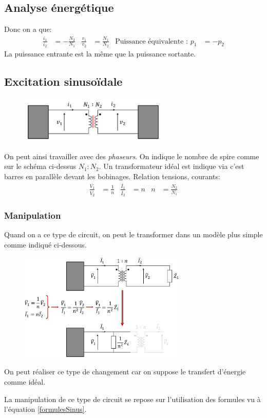 \documentclass{report}
\begin{document}
\subsection{Analyse énergétique}
Donc on a que:
\begin{align*}
\frac{i_1}{i_2} &= - \frac{N_2}{N_1} &  \frac{v_1}{v_2} &=  \frac{N_1}{N_2} & \text{Puissance équivalente : } p_1 &= -p_2
\end{align*}
La puissance entrante est la même que la puissance sortante.

\subsection{Excitation sinusoïdale}
\begin{figure}[H]
\centering
\includegraphics[width=7cm]{img/transSinus.png}
\end{figure}
On peut ainsi travailler avec des \textit{phaseurs}. On indique le nombre de spire comme sur le schéma ci-dessus $N_1 : N_2$. Un transformateur idéal est indique via c'est barres en parallèle devant les bobinages. Relation tensions, courants:
\begin{align}
\frac{\overline{V_1}}{\overline{V_2}} &= \frac{1}{n} & \frac{\overline{I_1}}{\overline{I_2}} &= n & n &= \frac{N_2}{N_1}
\label{formulesSinus}
\end{align}

\subsubsection{Manipulation}
Quand on a ce type de circuit, on peut le transformer dans un modèle plus simple comme indiqué ci-dessous.
\begin{figure}[H]
\centering
\includegraphics[width=8cm]{img/manipTrans.png}
\end{figure}
On peut réaliser ce type de changement car on suppose le transfert d'énergie comme idéal.\par
La manipulation de ce type de circuit se repose sur l'utilisation des formules vu à l'équation \ref{formulesSinus}.
\end{document}
